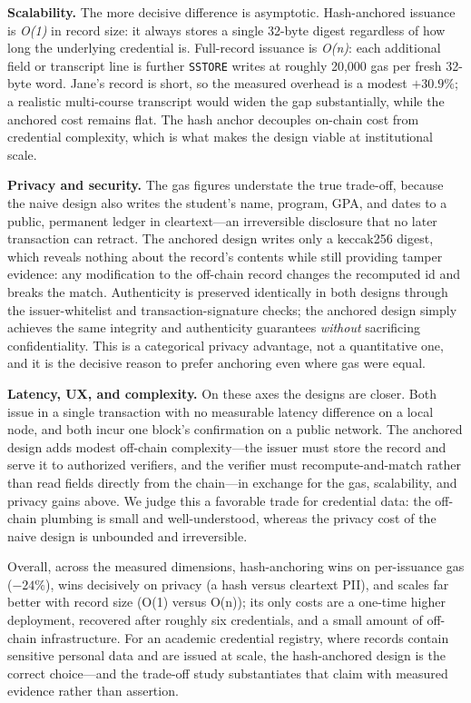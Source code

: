\documentclass[conference]{IEEEtran}
\begin{document}
\textbf{Scalability.} The more decisive difference is asymptotic. Hash-anchored issuance is \emph{O(1)} in record size: it always stores a single 32-byte digest regardless of how long the underlying credential is. Full-record issuance is \emph{O(n)}: each additional field or transcript line is further \texttt{SSTORE} writes at roughly 20{,}000 gas per fresh 32-byte word. Jane's record is short, so the measured overhead is a modest $+30.9\%$; a realistic multi-course transcript would widen the gap substantially, while the anchored cost remains flat. The hash anchor decouples on-chain cost from credential complexity, which is what makes the design viable at institutional scale.

\textbf{Privacy and security.} The gas figures understate the true trade-off, because the naive design also writes the student's name, program, GPA, and dates to a public, permanent ledger in cleartext---an irreversible disclosure that no later transaction can retract. The anchored design writes only a keccak256 digest, which reveals nothing about the record's contents while still providing tamper evidence: any modification to the off-chain record changes the recomputed id and breaks the match. Authenticity is preserved identically in both designs through the issuer-whitelist and transaction-signature checks; the anchored design simply achieves the same integrity and authenticity guarantees \emph{without} sacrificing confidentiality. This is a categorical privacy advantage, not a quantitative one, and it is the decisive reason to prefer anchoring even where gas were equal.

\textbf{Latency, UX, and complexity.} On these axes the designs are closer. Both issue in a single transaction with no measurable latency difference on a local node, and both incur one block's confirmation on a public network. The anchored design adds modest off-chain complexity---the issuer must store the record and serve it to authorized verifiers, and the verifier must recompute-and-match rather than read fields directly from the chain---in exchange for the gas, scalability, and privacy gains above. We judge this a favorable trade for credential data: the off-chain plumbing is small and well-understood, whereas the privacy cost of the naive design is unbounded and irreversible.

Overall, across the measured dimensions, hash-anchoring wins on per-issuance gas ($-24\%$), wins decisively on privacy (a hash versus cleartext PII), and scales far better with record size (O(1) versus O(n)); its only costs are a one-time higher deployment, recovered after roughly six credentials, and a small amount of off-chain infrastructure. For an academic credential registry, where records contain sensitive personal data and are issued at scale, the hash-anchored design is the correct choice---and the trade-off study substantiates that claim with measured evidence rather than assertion.
\end{document}
